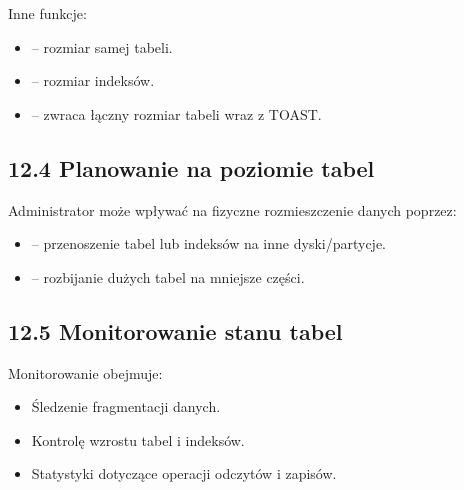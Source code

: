 \documentclass[a4paper,11pt,polish]{sphinxmanual}
\begin{document}
\sphinxAtStartPar
Inne funkcje:
\begin{itemize}
\item {} 
\sphinxAtStartPar
{} – rozmiar samej tabeli.

\item {} 
\sphinxAtStartPar
{} – rozmiar indeksów.

\item {} 
\sphinxAtStartPar
{} – zwraca łączny rozmiar tabeli wraz z TOAST.

\end{itemize}


\subsection{12.4 Planowanie na poziomie tabel}
\label{\detokenize{Konfiguracja_baz_danych/Konfiguracja_baz_danych:planowanie-na-poziomie-tabel}}
\sphinxAtStartPar
Administrator może wpływać na fizyczne rozmieszczenie danych poprzez:
\begin{itemize}
\item {} 
\sphinxAtStartPar
{} – przenoszenie tabel lub indeksów na inne dyski/partycje.

\item {} 
\sphinxAtStartPar
{} – rozbijanie dużych tabel na mniejsze części.

\end{itemize}


\subsection{12.5 Monitorowanie stanu tabel}
\label{\detokenize{Konfiguracja_baz_danych/Konfiguracja_baz_danych:monitorowanie-stanu-tabel}}
\sphinxAtStartPar
Monitorowanie obejmuje:
\begin{itemize}
\item {} 
\sphinxAtStartPar
Śledzenie fragmentacji danych.

\item {} 
\sphinxAtStartPar
Kontrolę wzrostu tabel i indeksów.

\item {} 
\sphinxAtStartPar
Statystyki dotyczące operacji odczytów i zapisów.

\end{itemize}
\end{document}
